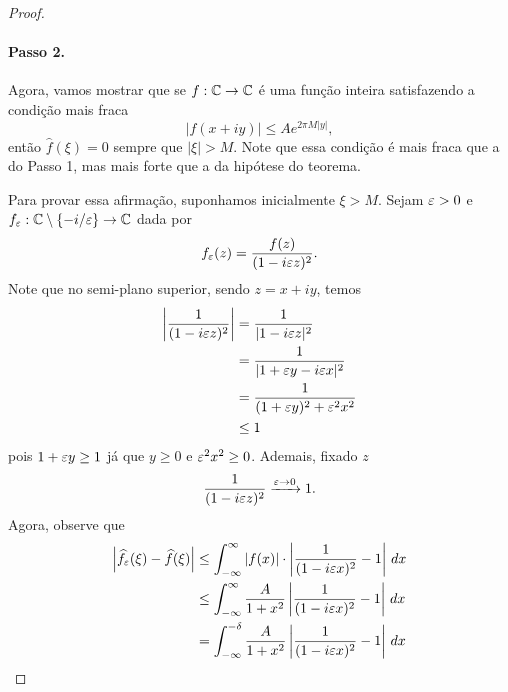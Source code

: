 \begin{proof}
            \paragraph{Passo 2.} Agora, vamos mostrar que se $f:\mathbb{C}\to\mathbb{C}$
            é uma função inteira satisfazendo a condição mais fraca
            \begin{equation*}
                |f(x+iy)| \leq Ae^{2\pi M|y|},
            \end{equation*}
            então $\widehat{f}(\xi) = 0$ sempre que $|\xi| > M$. Note
            que essa condição é mais fraca que a do Passo 1, mas mais
            forte que a da hipótese do teorema.
            
            Para provar essa afirmação, suponhamos inicialmente $\xi>M$.
            Sejam $\varepsilon>0$ e $f_{\varepsilon}:\mathbb{C}\setminus\{-i/\varepsilon\}\to\mathbb{C}$ dada por
            \begin{equation*}
                f_{\varepsilon}(z) = \frac{f(z)}{(1 - i\varepsilon z)^2}.
            \end{equation*}
            Note que no semi-plano superior, sendo $z=x+iy$, temos
            \begin{align*}
                \left| \frac{1}{(1-i\varepsilon z)^2} \right| &= \frac{1}{|1-i\varepsilon z|^2} \\
                                                     &= \frac{1}{|1+\varepsilon y - i\varepsilon x|^2} \\
                                                     &= \frac{1}{(1+\varepsilon y)^2 + \varepsilon^2x^2} \\
                                                     &\leq 1
            \end{align*}
            pois $1+\varepsilon y \geq 1$ já que $y\geq 0$ e $\varepsilon^2x^2 \geq 0$. Ademais, fixado $z$
            \begin{equation*}
                \frac{1}{(1-i\varepsilon z)^2} \xrightarrow{\varepsilon \to 0} 1.
            \end{equation*}
            Agora, observe que
            \begin{align*}
                \left| \widehat{f_{\e}}(\xi) - \widehat{f}(\xi) \right| 
                &\leq \int_{-\infty}^{\infty} |f(x)|\cdot\left| \frac{1}{(1-i\e x)^2} - 1 \right| \, dx \\
                &\leq \int_{-\infty}^{\infty} \frac{A}{1+ x^2}\left| \frac{1}{(1-i\e x)^2} - 1 \right| \, dx \\
                &= \int_{-\infty}^{-\delta} \frac{A}{1+ x^2}\left| \frac{1}{(1-i\e x)^2} - 1 \right| \, dx \\

\end{align*}
\end{proof}
